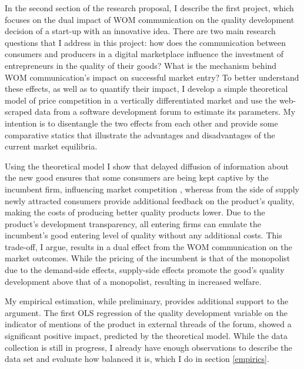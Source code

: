 \documentclass[13pt]{article}
\numberwithin{figure}{section}
\numberwithin{table}{section}
\theoremstyle{indented}
\numberwithin{equation}{section} %
\begin{document}
In the second section of the research proposal, I describe the first project, which focuses on the dual impact of WOM communication on the quality development decision of a start-up with an innovative idea. There are two main research questions that I address in this project: how does the communication between consumers and producers in a digital marketplace influence the investment of entrepreneurs in the quality of their goods? What is the mechanism behind WOM communication's impact on successful market entry? To better understand these effects, as well as to quantify their impact, I develop a simple theoretical model of price competition in a vertically differentiated market and use the web-scraped data from a software development forum to estimate its parameters. My intention is to disentangle the two effects from each other and provide some comparative statics that illustrate the advantages and disadvantages of the current market equilibria. 

Using the theoretical model I show that delayed diffusion of information about the new good ensures that some consumers are being kept captive by the incumbent firm, influencing market competition \citep{Fainmesser2020}, whereas from the side of supply newly attracted consumers provide additional feedback on the product's quality, making the costs of producing better quality products lower. Due to the product's development transparency, all entering firms can emulate the incumbent's good entering level of quality without any additional costs. This trade-off, I argue, results in a dual effect from the WOM communication on the market outcomes. While the pricing of the incumbent is that of the monopolist due to the demand-side effects, supply-side effects promote the good's quality development above that of a monopolist, resulting in increased welfare.

My empirical estimation, while preliminary, provides additional support to the argument. The first OLS regression of the quality development variable on the indicator of mentions of the product in external threads of the forum, showed a significant positive impact, predicted by the theoretical model. While the data collection is still in progress, I already have enough observations to describe the data set and evaluate how balanced it is, which I do in section \ref{empirics}.

\end{document}
